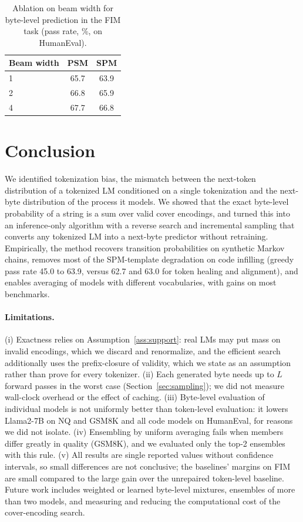 \documentclass{article} %
\begin{document}
\begin{table}[t]
\caption{Ablation on beam width for byte-level prediction in the FIM task (pass rate, \%, on HumanEval).}
\label{tab:beam}
\begin{center}
\begin{tabular}{lcc}
\toprule
Beam width & PSM & SPM \\
\midrule
1 & 65.7 & 63.9 \\
2 & 66.8 & 65.9 \\
4 & 67.7 & 66.8 \\
\bottomrule
\end{tabular}
\end{center}
\end{table}

\section{Conclusion}
\label{sec:conclusion}
We identified tokenization bias, the mismatch between the next-token distribution of a tokenized LM conditioned on a single tokenization and the next-byte distribution of the process it models. We showed that the exact byte-level probability of a string is a sum over valid cover encodings, and turned this into an inference-only algorithm with a reverse search and incremental sampling that converts any tokenized LM into a next-byte predictor without retraining. Empirically, the method recovers transition probabilities on synthetic Markov chains, removes most of the SPM-template degradation on code infilling (greedy pass rate 45.0 to 63.9, versus 62.7 and 63.0 for token healing and alignment), and enables averaging of models with different vocabularies, with gains on most benchmarks.

\paragraph{Limitations.}
(i) Exactness relies on Assumption~\ref{ass:support}: real LMs may put mass on invalid encodings, which we discard and renormalize, and the efficient search additionally uses the prefix-closure of validity, which we state as an assumption rather than prove for every tokenizer. (ii) Each generated byte needs up to $L$ forward passes in the worst case (Section~\ref{sec:sampling}); we did not measure wall-clock overhead or the effect of caching. (iii) Byte-level evaluation of individual models is not uniformly better than token-level evaluation: it lowers Llama2-7B on NQ and GSM8K and all code models on HumanEval, for reasons we did not isolate. (iv) Ensembling by uniform averaging fails when members differ greatly in quality (GSM8K), and we evaluated only the top-2 ensembles with this rule. (v) All results are single reported values without confidence intervals, so small differences are not conclusive; the baselines' margins on FIM are small compared to the large gain over the unrepaired token-level baseline. Future work includes weighted or learned byte-level mixtures, ensembles of more than two models, and measuring and reducing the computational cost of the cover-encoding search.
\end{document}
